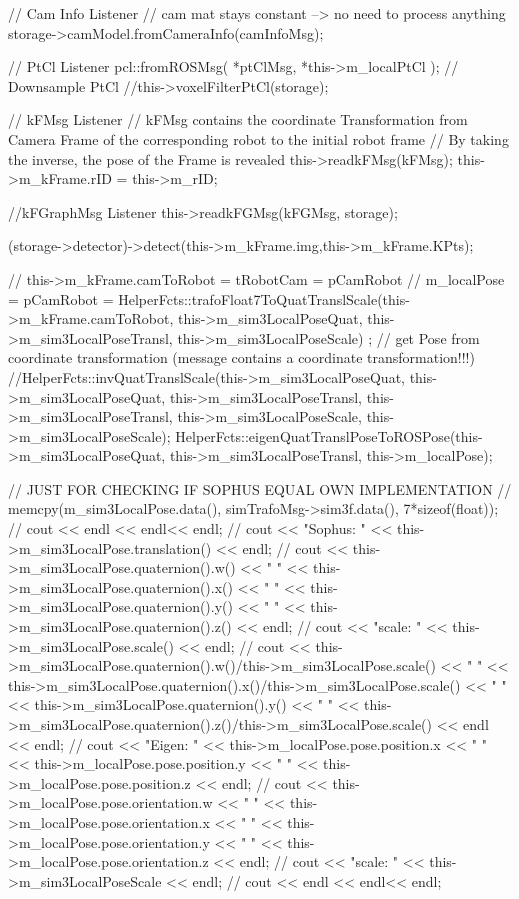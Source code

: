 \begin{DoxyCode}
                                         {

        // Cam Info Listener
        // cam mat stays constant --> no need to process anything
        storage->camModel.fromCameraInfo(camInfoMsg);

        // PtCl Listener
        pcl::fromROSMsg( *ptClMsg, *this->m_localPtCl );
        // Downsample PtCl
        //this->voxelFilterPtCl(storage);

        // kFMsg Listener
        // kFMsg contains the coordinate Transformation from Camera Frame of
       the corresponding robot to the initial robot frame
        // By taking the inverse, the pose of the Frame is revealed
        this->readkFMsg(kFMsg);
        this->m_kFrame.rID = this->m_rID;

        //kFGraphMsg Listener
        this->readkFGMsg(kFGMsg, storage);

        (storage->detector)->detect(this->m_kFrame.img,this->m_kFrame.KPts);

        // this->m_kFrame.camToRobot = tRobotCam = pCamRobot
        // m_localPose = pCamRobot =
        HelperFcts::trafoFloat7ToQuatTranslScale(this->m_kFrame.camToRobot, 
      this->m_sim3LocalPoseQuat, this->m_sim3LocalPoseTransl, this->m_sim3LocalPoseScale)
      ;
        // get Pose from coordinate transformation (message contains a
       coordinate transformation!!!)
        //HelperFcts::invQuatTranslScale(this->m_sim3LocalPoseQuat,
       this->m_sim3LocalPoseQuat, this->m_sim3LocalPoseTransl, this->m_sim3LocalPoseTransl,
       this->m_sim3LocalPoseScale, this->m_sim3LocalPoseScale);
        HelperFcts::eigenQuatTranslPoseToROSPose(this->m_sim3LocalPoseQuat, 
      this->m_sim3LocalPoseTransl, this->m_localPose);


        // JUST FOR CHECKING IF SOPHUS EQUAL OWN IMPLEMENTATION
//      memcpy(m_sim3LocalPose.data(), simTrafoMsg->sim3f.data(),
       7*sizeof(float));
//      cout << endl << endl<< endl;
//      cout << "Sophus: " << this->m_sim3LocalPose.translation() << endl;
//      cout << this->m_sim3LocalPose.quaternion().w() << " " <<
       this->m_sim3LocalPose.quaternion().x() << " " << this->m_sim3LocalPose.quaternion().y() << " "
       << this->m_sim3LocalPose.quaternion().z() << endl;
//      cout << "scale: " << this->m_sim3LocalPose.scale() << endl;
//      cout <<
       this->m_sim3LocalPose.quaternion().w()/this->m_sim3LocalPose.scale() << " " <<
       this->m_sim3LocalPose.quaternion().x()/this->m_sim3LocalPose.scale() << " " << this->m_sim3LocalPose.quaternion().y() << " " <<
       this->m_sim3LocalPose.quaternion().z()/this->m_sim3LocalPose.scale() << endl << endl;
//      cout << "Eigen: " << this->m_localPose.pose.position.x << " " <<
       this->m_localPose.pose.position.y << " " << this->m_localPose.pose.position.z << endl;
//      cout << this->m_localPose.pose.orientation.w << " " <<
       this->m_localPose.pose.orientation.x << " " << this->m_localPose.pose.orientation.y << " " <<
       this->m_localPose.pose.orientation.z << endl;
//      cout << "scale: " << this->m_sim3LocalPoseScale << endl;
//      cout << endl << endl<< endl;

}
\end{DoxyCode}
